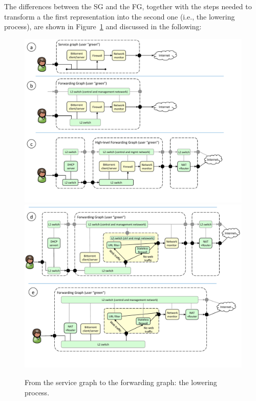 The differences between the SG and the FG, together with the steps needed to transform a the first representation into the second one (i.e., the lowering process), are shown in Figure~\ref{fig:graphs} and discussed in the following:


\begin{figure}[h]
	\centering
	\includegraphics[clip= true, width= 0.8\columnwidth, trim= 0.0cm 1.4cm 1.2cm 0.0cm]{images/NF-FG.pdf}
	\includegraphics[clip= true, width= 0.8\columnwidth, trim= 0cm 1.8cm 0.2cm 0.0cm]{images/NF-FG2.pdf}
	\caption{From the service graph to the forwarding graph: the lowering process.}
	\label{fig:network_function_forwarding_graph}
	\label{fig:graphs}
\end{figure}

